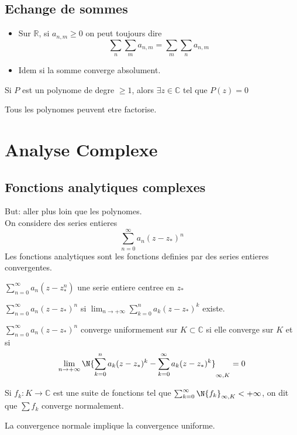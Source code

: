\documentclass[../main.tex]{subfiles}
\begin{document}
\subsection{Echange de sommes}
\begin{itemize}
\item Sur $\mathbb{R}$, si $a_{n,m} \geq 0$ on peut toujours dire
	\[ 
		\sum_n \sum_m a_{n,m} = \sum_{m} \sum_n a_{n,m} 
	\]

\item Idem si la somme converge absolument.
	
\end{itemize}
\begin{thm}
	Si $P$ est un polynome de degre $ \geq 1$, alors $\exists z \in \mathbb{C} $ tel que $P( z) =0$
\end{thm}
\begin{crly}
Tous les polynomes peuvent etre factorise.
\end{crly}
\section{Analyse Complexe}
\subsection{Fonctions analytiques complexes}
But: aller plus loin que les polynomes.\\
On considere des series entieres
\[ 
	\sum_{n=0}^{ \infty }a_n( z-z_\ast) ^{n}
\]
Les fonctions analytiques sont les fonctions definies par des series entieres convergentes.
\begin{defn}
	$ \sum_{n=0}^{ \infty }a_n ( z-z_{\ast} ^{n}) $ une serie entiere centree en $z_{\ast}$ 
\end{defn}
\begin{defn}
	$ \sum_{n=0}^{ \infty }a_n ( z-z_{\ast} ) ^{n}$ si $\lim_{n \to  + \infty} \sum_{k=0}^{ n}a_k ( z-z_{\ast}) ^{k}$ existe.
\end{defn}
\begin{defn}
	$ \sum_{n=0}^{ \infty }a_n ( z-z_{\ast} ) ^{n}$ converge uniformement sur $K \subset \mathbb{C}$ si elle converge sur $K$ et si
	\[ 
		\lim_{n \to  + \infty} \N { \sum_{k=0}^{ n} a_k ( z-z_{\ast} ) ^{k}-\sum_{k=0}^{ \infty } a_k ( z-z_{\ast} ) ^{k}} _{ \infty ,K}=0 	
	\]
					
\end{defn}
\begin{defn}
	Si $f_k: K \to \mathbb{C} $ est une suite de fonctions tel que $ \sum_{k=0}^{ \infty }\N { f_k}_{ \infty ,K} < + \infty $, on dit que $\sum f_k$ converge normalement.
\end{defn}
\begin{lemma}
La convergence normale implique la convergence uniforme.
\end{lemma}
\end{document}
